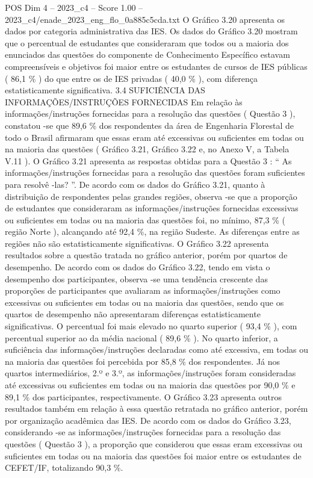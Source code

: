 \begin{textsample}{POS Dim 4 – 2023\_c4 – Score 1.00 – 2023\_c4/enade\_2023\_eng\_flo\_0a885c5cda.txt}
O Gráfico 3.20 apresenta os dados por categoria administrativa das IES.
Os dados do Gráfico 3.20 mostram que o percentual de estudantes que consideraram que todos ou a maioria dos enunciados das questões do componente de Conhecimento Específico estavam compreensíveis e objetivos foi maior entre os estudantes de cursos de IES públicas ( 86,1 \% ) do que entre os de IES privadas ( 40,0 \% ), com diferença estatisticamente significativa. 3.4 SUFICIÊNCIA DAS INFORMAÇÕES/INSTRUÇÕES FORNECIDAS Em relação às informações/instruções fornecidas para a resolução das questões ( Questão 3 ), constatou -se que 89,6 \% dos respondentes da área de Engenharia Florestal de todo o Brasil afirmaram que essas eram até excessivas ou suficientes em todas ou na maioria das questões ( Gráfico 3.21, Gráfico 3.22 e, no Anexo V, a Tabela V.11 ).
O Gráfico 3.21 apresenta as respostas obtidas para a Questão 3 : “ As informações/instruções fornecidas para a resolução das questões foram suficientes para resolvê -las? ”.
De acordo com os dados do Gráfico 3.21, quanto à distribuição de respondentes pelas grandes regiões, observa -se que a proporção de estudantes que consideraram as informações/instruções fornecidas excessivas ou suficientes em todas ou na maioria das questões foi, no mínimo, 87,3 \% ( região Norte ), alcançando até 92,4 \%, na região Sudeste.
As diferenças entre as regiões não são estatisticamente significativas.
O Gráfico 3.22 apresenta resultados sobre a questão tratada no gráfico anterior, porém por quartos de desempenho.
De acordo com os dados do Gráfico 3.22, tendo em vista o desempenho dos participantes, observa -se uma tendência crescente das proporções de participantes que avaliaram as informações/instruções como excessivas ou suficientes em todas ou na maioria das questões, sendo que os quartos de desempenho não apresentaram diferenças estatisticamente significativas.
O percentual foi mais elevado no quarto superior ( 93,4 \% ), com percentual superior ao da média nacional ( 89,6 \% ).
No quarto inferior, a suficiência das informações/instruções declaradas como até excessiva, em todas ou na maioria das questões foi percebida por 85,8 \% dos respondentes.
Já nos quartos intermediários, 2.º e 3.º, as informações/instruções foram consideradas até excessivas ou suficientes em todas ou na maioria das questões por 90,0 \% e 89,1 \% dos participantes, respectivamente.
O Gráfico 3.23 apresenta outros resultados também em relação à essa questão retratada no gráfico anterior, porém por organização acadêmica das IES.
De acordo com os dados do Gráfico 3.23, considerando -se as informações/instruções fornecidas para a resolução das questões ( Questão 3 ), a proporção que considerou que essas eram excessivas ou suficientes em todas ou na maioria das questões foi maior entre os estudantes de CEFET/IF, totalizando 90,3 \%.

\end{textsample}

